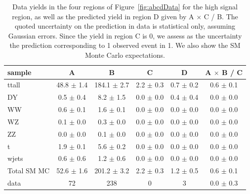 \begin{table}[hbt]
\begin{center}
\caption{\label{tab:datayield3} Data yields in the four
regions of Figure~\ref{fig:abcdData} for the high \Ht signal region, 
as well as the predicted yield in region D given
by A $\times$ C / B.  The quoted uncertainty
on the prediction in data is statistical only, assuming Gaussian errors.
Since the yield in region C is 0, we assess as the uncertainty the prediction
corresponding to 1 observed event in 1.
We also show the SM Monte Carlo expectations.}
\begin{tabular}{l||c|c|c|c||c}
\hline
           sample  &                A  &                B  &                C  &                D  &   A $\times$ B / C  \\
\hline
            ttall  & 48.8  $\pm$  1.4  &184.1  $\pm$  2.7  &  2.2  $\pm$  0.3  &  0.7  $\pm$  0.2  &  0.6  $\pm$  0.1   \\
               DY  &  0.5  $\pm$  0.4  &  8.2  $\pm$  1.5  &  0.0  $\pm$  0.0  &  0.4  $\pm$  0.4  &  0.0  $\pm$  0.0   \\
               WW  &  0.6  $\pm$  0.1  &  1.6  $\pm$  0.1  &  0.0  $\pm$  0.0  &  0.0  $\pm$  0.0  &  0.0  $\pm$  0.0   \\
               WZ  &  0.1  $\pm$  0.0  &  0.3  $\pm$  0.0  &  0.0  $\pm$  0.0  &  0.0  $\pm$  0.0  &  0.0  $\pm$  0.0   \\
               ZZ  &  0.0  $\pm$  0.0  &  0.1  $\pm$  0.0  &  0.0  $\pm$  0.0  &  0.0  $\pm$  0.0  &  0.0  $\pm$  0.0   \\
                t  &  1.9  $\pm$  0.1  &  5.6  $\pm$  0.2  &  0.0  $\pm$  0.0  &  0.0  $\pm$  0.0  &  0.0  $\pm$  0.0   \\
            wjets  &  0.6  $\pm$  0.6  &  1.2  $\pm$  0.6  &  0.0  $\pm$  0.0  &  0.0  $\pm$  0.0  &  0.0  $\pm$  0.0   \\
\hline
      Total SM MC  & 52.6  $\pm$  1.6  &201.2  $\pm$  3.2  &  2.2  $\pm$  0.3  &  1.2  $\pm$  0.5  &  0.6  $\pm$  0.1   \\
\hline
             data  &               72  &              238  &                0  &                3  &  0.0  $\pm$  0.3   \\
\hline
\end{tabular}
\end{center}
\end{table}

\newpage


